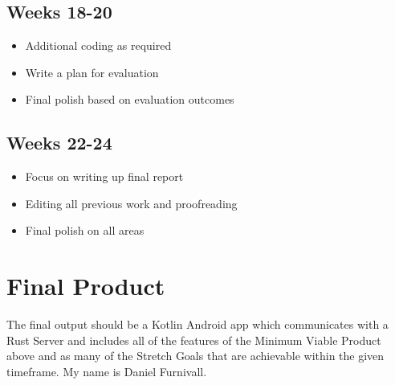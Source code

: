 \documentclass{mproj}
\begin{document}
\subsection{Weeks 18-20}
\begin{itemize}
    \item Additional coding as required
    \item Write a plan for evaluation
    \item Final polish based on evaluation outcomes
\end{itemize}

\subsection{Weeks 22-24}
\begin{itemize}
    \item Focus on writing up final report
    \item Editing all previous work and proofreading
    \item Final polish on all areas
\end{itemize}

\section{Final Product}
The final output should be a Kotlin Android app which communicates with a Rust Server and includes all of the features of the Minimum Viable Product above and as many of the Stretch Goals that are achievable within the given timeframe. My name is Daniel Furnivall.








\end{document}
